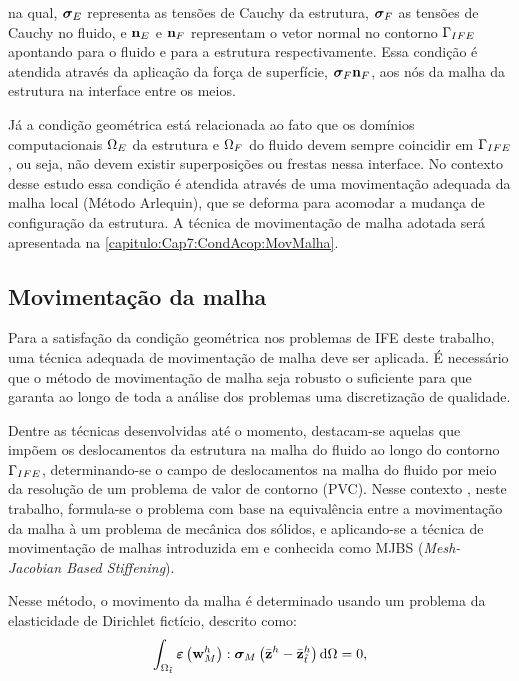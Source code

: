 \noindent na qual, $\boldsymbol{\sigma}_{E}$ representa as tensões de Cauchy da estrutura, $\boldsymbol{\sigma}_{F}$ as tensões de Cauchy no fluido, e $\mathbf{n}_{E}$ e $\mathbf{n}_{F}$ representam o vetor normal no contorno $\Gamma_{IFE}$ apontando para o fluido e para a estrutura respectivamente. Essa condição é atendida através da aplicação da força de superfície, $\boldsymbol{\sigma}_{F} \mathbf{n}_{F}$, aos nós da malha da estrutura na interface entre os meios.

Já a condição geométrica está relacionada ao fato que os domínios computacionais $\Omega_{E}$ da estrutura e $\Omega_{F}$ do fluido devem sempre coincidir em $\Gamma_{IFE}$, ou seja, não devem existir superposições ou frestas nessa interface. No contexto desse estudo essa condição é atendida através de uma movimentação adequada da malha local (Método Arlequin), que se deforma para acomodar a mudança de configuração da estrutura. A técnica de movimentação de malha adotada será apresentada na \autoref{capitulo:Cap7:CondAcop:MovMalha}.

\subsection{Movimentação da malha} \label{capitulo:Cap7:CondAcop:MovMalha}

Para a satisfação da condição geométrica nos problemas de IFE deste trabalho, uma técnica adequada de movimentação de malha deve ser aplicada. É necessário que o método de movimentação de malha seja robusto o suficiente para que garanta ao longo de toda a análise dos problemas uma discretização de qualidade.

Dentre as técnicas desenvolvidas até o momento, destacam-se aquelas que impõem os deslocamentos da estrutura na malha do fluido ao longo do contorno $\Gamma_{IFE}$, determinando-se o campo de deslocamentos na malha do fluido por meio da resolução de um problema de valor de contorno (PVC). Nesse contexto , neste trabalho, formula-se o problema com base na equivalência entre a movimentação da malha à um problema de mecânica dos sólidos, e aplicando-se a técnica de movimentação de malhas introduzida em  e  conhecida como MJBS (\textit{Mesh-Jacobian Based Stiffening}).

Nesse método, o movimento da malha é determinado usando um problema da elasticidade de Dirichlet fictício, descrito como:
\begin{align}
	\int_{\Omega_{\tilde{t}}} \bm{\varepsilon} \left(\mathbf{w}_{M}^h\right) : \boldsymbol{\sigma}_{M} \left(\bar{\mathbf{z}}^h - \bar{\mathbf{z}}_{\tilde{t}}^h \right) \mathrm{d} \Omega = 0,
	\label{eq:elasticity}
\end{align}

